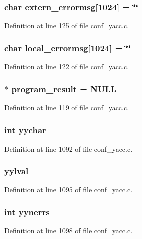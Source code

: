 \subsubsection[{extern\_\-errormsg}]{\setlength{\rightskip}{0pt plus 5cm}char {\bf extern\_\-errormsg}[1024] = \char`\"{}\char`\"{}}\label{conf__yacc_8c_c80358e39707c0c4c3f489380b86e4fb}




Definition at line 125 of file conf\_\-yacc.c.
\subsubsection[{local\_\-errormsg}]{\setlength{\rightskip}{0pt plus 5cm}char {\bf local\_\-errormsg}[1024] = \char`\"{}\char`\"{}}\label{conf__yacc_8c_8b1ec6ad5bb54bdc896259e22311dbfa}




Definition at line 122 of file conf\_\-yacc.c.
\subsubsection[{program\_\-result}]{$\ast$ {\bf program\_\-result} = NULL}\label{conf__yacc_8c_538cfb02bc69bba6c1b09fd1eadbe58b}




Definition at line 119 of file conf\_\-yacc.c.
\subsubsection[{yychar}]{\setlength{\rightskip}{0pt plus 5cm}int {\bf yychar}}\label{conf__yacc_8c_9e2c7c7373b818c86b2df7106a92327c}




Definition at line 1092 of file conf\_\-yacc.c.
\subsubsection[{yylval}]{ {\bf yylval}}\label{conf__yacc_8c_539b86ee4bb46824a194f22eb69903d9}




Definition at line 1095 of file conf\_\-yacc.c.
\subsubsection[{yynerrs}]{\setlength{\rightskip}{0pt plus 5cm}int {\bf yynerrs}}\label{conf__yacc_8c_0ea9e3b522e448ac462274fe70e1be82}




Definition at line 1098 of file conf\_\-yacc.c.